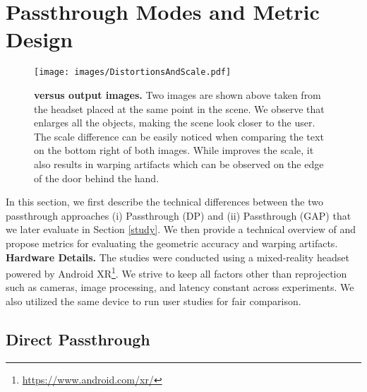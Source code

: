 \section{Passthrough Modes and Metric Design}

\begin{figure*}[htbp]
    \texttt{[image: images/DistortionsAndScale.pdf]}
    \caption{\textbf{\DP versus \GAP output images.} Two images are shown above taken from the headset placed at the same point in the scene. We observe that \DP enlarges all the objects, making the scene look closer to the user. The scale difference can be easily noticed when comparing the text on the bottom right of both images. While \GAP improves the scale, it also results in warping artifacts which can be observed on the edge of the door behind the hand.}
    \label{fig:artifacts}
\end{figure*}

In this section, we first describe the technical differences between the two passthrough approaches (i) \Directpassthrough Passthrough (DP) and (ii) \DepthPassthrough Passthrough (GAP) that we later evaluate in Section \ref{study}. 
We then provide a technical overview of \GAP and propose metrics for evaluating the geometric accuracy and warping artifacts.
\newline
\textbf{Hardware Details.} The studies were conducted using a mixed-reality headset powered by Android XR\footnote[1]{\url{https://www.android.com/xr/}}.  
We strive to keep all factors other than reprojection such as cameras, image processing, and latency constant across experiments. 
We also utilized the same device to run user studies for fair comparison. 

\subsection{Direct Passthrough}

